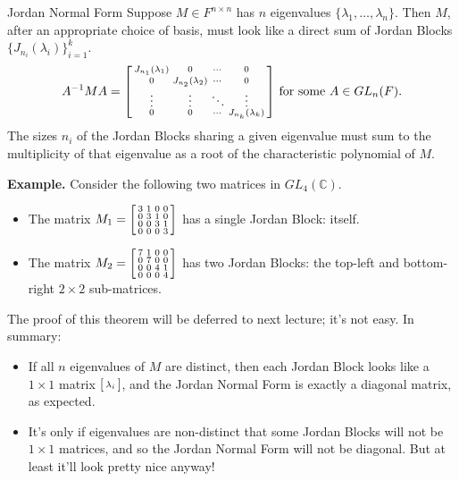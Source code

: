 \begin{theorem}{Jordan Normal Form}
    Suppose $M \in F^{n \times n}$ has $n$ eigenvalues $\{\lambda_1, \dots, \lambda_n\}$.  Then $M$, after an appropriate choice of basis, must look like a direct sum of Jordan Blocks $\{J_{n_i}(\lambda_i)\}_{i = 1}^k$.
    \[ A^{-1} M A = \begin{bsmallmatrix} J_{n_1}(\lambda_1) & 0 & \cdots & 0 \\ 0 & J_{n_2}(\lambda_2) & \cdots & 0 \\ \vdots & \vdots & \ddots & \vdots \\ 0 & 0 & \cdots & J_{n_k}(\lambda_k) \end{bsmallmatrix} \text{ for some } A \in GL_n(F). \]
    The sizes $n_i$ of the Jordan Blocks sharing a given eigenvalue must sum to the multiplicity of that eigenvalue as a root of the characteristic polynomial of $M$.
\end{theorem}

\textbf{Example.} Consider the following two matrices in $GL_4(\mathbb{C})$.
\begin{itemize}
    \item The matrix $M_1 = \begin{bsmallmatrix} 3 & 1 & 0 & 0 \\ 0 & 3 & 1 & 0 \\ 0 & 0 & 3 & 1 \\ 0 & 0 & 0 & 3 \end{bsmallmatrix}$ has a single Jordan Block: itself.
    \item The matrix $M_2 = \begin{bsmallmatrix} 7 & 1 & 0 & 0 \\ 0 & 7 & 0 & 0 \\ 0 & 0 & 4 & 1 \\ 0 & 0 & 0 & 4 \end{bsmallmatrix}$ has two Jordan Blocks: the top-left and bottom-right $2 \times 2$ sub-matrices.
\end{itemize}

The proof of this theorem will be deferred to next lecture; it's not easy.  In summary:
\begin{itemize}
    \item If all $n$ eigenvalues of $M$ are distinct, then each Jordan Block looks like a $1 \times 1$ matrix $\begin{bsmallmatrix} \lambda_i \end{bsmallmatrix}$, and the Jordan Normal Form is exactly a diagonal matrix, as expected.
    \item It's only if eigenvalues are non-distinct that some Jordan Blocks will not be $1 \times 1$ matrices, and so the Jordan Normal Form will not be diagonal.  But at least it'll look pretty nice anyway!
\end{itemize}

